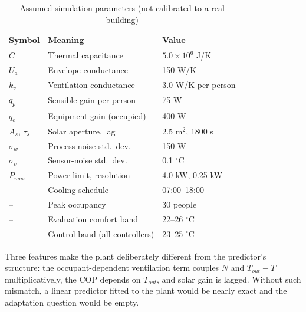 \documentclass[conference]{IEEEtran}
\newcommand{\degC}{\ensuremath{^{\circ}}C}
\begin{document}
\begin{table}[!t]
\renewcommand{\arraystretch}{1.05}
\caption{Assumed simulation parameters (not calibrated to a real building)}
\label{tab:params}
\centering\footnotesize
\begin{tabular}{lll}
\hline
Symbol & Meaning & Value\\
\hline
$C$ & Thermal capacitance & $5.0\times10^{6}$ J/K\\
$U_a$ & Envelope conductance & 150 W/K\\
$k_v$ & Ventilation conductance & 3.0 W/K per person\\
$q_p$ & Sensible gain per person & 75 W\\
$q_e$ & Equipment gain (occupied) & 400 W\\
$A_s$, $\tau_s$ & Solar aperture, lag & 2.5 m$^2$, 1800 s\\
$\sigma_w$ & Process-noise std.\ dev. & 150 W\\
$\sigma_v$ & Sensor-noise std.\ dev. & 0.1 \degC\\
$P_{max}$ & Power limit, resolution & 4.0 kW, 0.25 kW\\
-- & Cooling schedule & 07:00--18:00\\
-- & Peak occupancy & 30 people\\
-- & Evaluation comfort band & 22--26 \degC\\
-- & Control band (all controllers) & 23--25 \degC\\
\hline
\end{tabular}
\end{table}

Three features make the plant deliberately different from the predictor's structure: the occupant-dependent ventilation term couples $N$ and $T_{out}-T$ multiplicatively, the COP depends on $T_{out}$, and solar gain is lagged. Without such mismatch, a linear predictor fitted to the plant would be nearly exact and the adaptation question would be empty.
\end{document}

